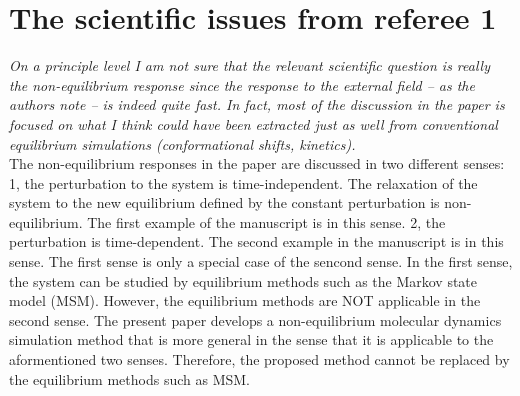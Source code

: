 \documentclass[]{revtex4-1}
\begin{document}
\section*{The scientific issues from referee 1}

\emph{On a principle level I am not sure that the relevant scientific
  question is really the non-equilibrium response since the response
  to the external field -- as the authors note -- is indeed quite
  fast. In fact, most of the discussion in the paper is focused on
  what I think could have been extracted just as well from
  conventional equilibrium simulations (conformational shifts,
  kinetics).}\\

The non-equilibrium responses in the paper are discussed in two
different senses: 1, the perturbation to the system is
time-independent.
The relaxation of the system to the new equilibrium
defined by the constant perturbation is non-equilibrium.
The first example of the manuscript is in this sense.  2, the
perturbation is time-dependent.  The second example in the manuscript
is in this sense.  The first sense is only a special case of the
sencond sense.  In the first sense, the system can be studied by
equilibrium methods such as the Markov state model (MSM). However, the
equilibrium methods are NOT applicable in the second sense.  The
present paper develops a non-equilibrium molecular dynamics simulation
method that is more general in the sense that it is applicable to the
aformentioned two senses. Therefore, the proposed method cannot be replaced
by the equilibrium methods such as MSM.
\end{document}
